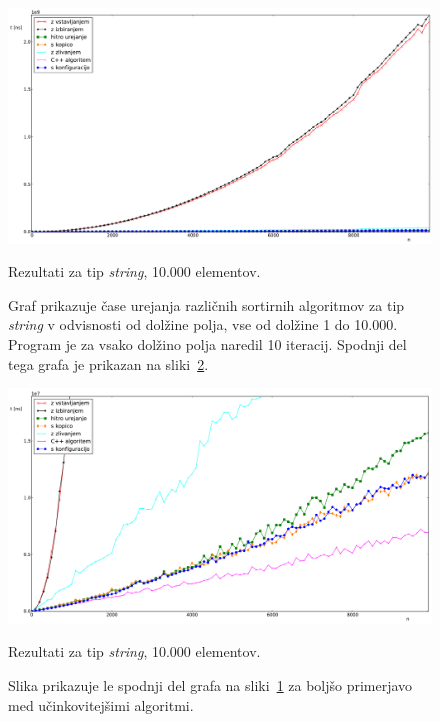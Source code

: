 \documentclass[a4paper,oneside,12pt]{article}
\begin{document}
\begin{figure}[h!]
    \includegraphics[width=\textwidth]{slike/string10000.pdf}
    \vspace{-0.7cm}
    \caption[Rezultati za tip \emph{string}, 10.000 el.]{Rezultati za tip
    \emph{string}, 10.000 elementov.}
    \caption*{{\small Graf prikazuje čase
    urejanja različnih sortirnih algoritmov za tip \emph{string} v odvisnosti od dolžine polja, vse
    od dolžine 1 do 10.000. Program je za vsako dolžino polja naredil 10
    iteracij. Spodnji del tega grafa je prikazan na
    sliki~\ref{fig:rez:string10000zoom}.}}
    \label{fig:rez:string10000}
\end{figure}

\begin{figure}[h!]
    \includegraphics[width=\textwidth]{slike/string10000zoom.pdf}
    \vspace{-0.7cm}
    \caption[Rezultati za tip \emph{string}, 10.000 el. -- izrez]{Rezultati za
    tip \emph{string}, 10.000 elementov.}
    \caption*{{\small Slika prikazuje le spodnji del grafa na sliki~\ref{fig:rez:string10000}
    za boljšo primerjavo med učinkovitejšimi algoritmi.}}
    \label{fig:rez:string10000zoom}
\end{figure}
\end{document}
